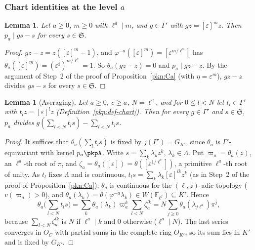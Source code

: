 \documentclass[10pt]{amsart}
\newtheorem{lemma}[theorem]{Lemma}
\theoremstyle{definition}
\theoremstyle{remark}
\begin{document}
\subsubsection{Chart identities at the level $a$}\label{pke:ss-chart}

\begin{lemma}\label{pke:triv}
Let $a\ge0$, $m\ge0$ with $\ell^a\mid m$, and $g\in\Gamma'$ with $gz=[\varepsilon]^mz$. Then $p_a\mid
gs-s$ for every $s\in\mathfrak S$.
\end{lemma}

\begin{proof}
$gz-z=z([\varepsilon]^m-1)$, and $\varphi^{-a}([\varepsilon]^m)=[\varepsilon^{m/\ell^a}]$ has
$\theta_a([\varepsilon]^m)=(\varepsilon^\sharp)^{m/\ell^a}=1$. So $\theta_a(gz-z)=0$ and $p_a\mid gz-z$. By the
argument of Step~2 of the proof of Proposition~\ref{pkn:Ca} (with $\eta=\varepsilon^m$), $gz-z$ divides
$gs-s$ for every $s\in\mathfrak S$.
\end{proof}

\begin{lemma}[Averaging]\label{pke:avg}
Let $a\ge0$, $c\ge a$, $N=\ell^c$, and for $0\le l<N$ let $t_l\in\Gamma'$ with $t_lz=[\varepsilon]^lz$
(Definition~\ref{pkp:def-chart}). Then for every $g\in\Gamma'$ and $s\in\mathfrak S$, $p_a$ divides
$g(\sum_{l<N}t_ls)-\sum_{l<N}t_ls$.
\end{lemma}

\begin{proof}
It suffices that $\theta_a(\sum_lt_ls)$ is fixed by $j(\Gamma')=G_{K'}$, since $\theta_a$ is
$\Gamma'$-equivariant with kernel $p_a\pkpA$. Write $s=\sum_k\lambda_kz^k$, $\lambda_k\in\Lambda$. Put
$\varpi_a=\theta_a(z)$, an $\ell^a$-th root of $\pi$, and $\zeta_a=\theta_a([\varepsilon])=
\theta([\varepsilon^{1/\ell^a}])$, a primitive $\ell^a$-th root of unity. As $t_l$ fixes $\Lambda$ and is
continuous, $t_ls=\sum_k\lambda_k[\varepsilon]^{lk}z^k$ (as in Step~2 of the proof of
Proposition~\ref{pkn:Ca}); $\theta_a$ is continuous for the $(\ell,z)$-adic topology ($v(\varpi_a)>0$), and
$\theta_a(\lambda_k)=\theta(\varphi^{-a}\lambda_k)\in W(\mathbb F_{\ell^f})\subseteq K'$. Hence
\[
\textstyle\theta_a\bigl(\sum_{l<N}t_ls\bigr)=\sum_k\theta_a(\lambda_k)\varpi_a^k\sum_{l<N}\zeta_a^{lk}
=N\sum_{j\ge0}\theta_a(\lambda_{j\ell^a})\pi^j,
\]
because $\sum_{l<N}\zeta_a^{lk}$ is $N$ if $\ell^a\mid k$ and $0$ otherwise ($\ell^a\mid N$). The last series
converges in $O_C$ with partial sums in the complete ring $O_{K'}$, so its sum lies in $K'$ and is fixed by
$G_{K'}$.
\end{proof}
\end{document}

